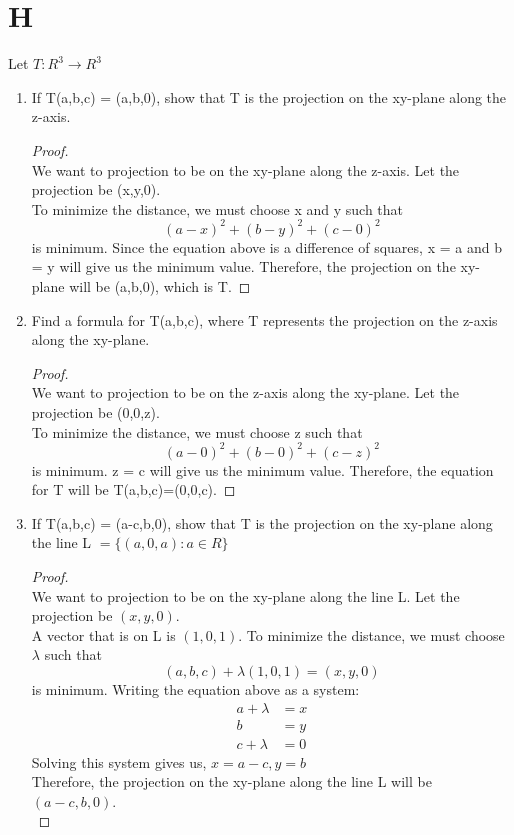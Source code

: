 \documentclass[11pt]{scrartcl}
\begin{document}
\section{H} 
Let $T: R^3 \rightarrow R^3$
\begin{enumerate}[label=\alph*.]
	\item{
	If T(a,b,c) = (a,b,0), show that T is the projection on the xy-plane along the z-axis.	
	\begin{proof}
	\-\\
	We want to projection to be on the xy-plane along the z-axis. Let the projection be (x,y,0).\\
	To minimize the distance, we must choose x and y such that
	$$(a - x)^2 + (b - y)^2 + (c - 0)^2$$
	is minimum.
	Since the equation above is a difference of squares, x = a and b = y will give us the minimum value.
	Therefore, the projection on the xy-plane will be (a,b,0), which is T.
	\end{proof}
	}
	
	\item{
	Find a formula for T(a,b,c), where T represents the projection on the z-axis along the xy-plane.
	\begin{proof}
	\-\\
	We want to projection to be on the z-axis along the xy-plane. Let the projection be (0,0,z).\\
	To minimize the distance, we must choose z such that
	$$(a - 0)^2 + (b - 0)^2 + (c - z)^2$$
	is minimum.
	z = c will give us the minimum value.
	Therefore, the equation for T will be T(a,b,c)=(0,0,c).
	\end{proof}
	}

	\item{
	If T(a,b,c) = (a-c,b,0), show that T is the projection on the xy-plane along the line L $= \{(a,0,a):a \in R\}$
	\begin{proof}
	\-\\
	We want to projection to be on the xy-plane along the line L. Let the projection be $(x,y,0)$.\\
	A vector that is on L is $(1,0,1)$.
	To minimize the distance, we must choose $\lambda$ such that
	$$(a,b,c) + \lambda (1,0,1) = (x,y,0)$$
	is minimum. Writing the equation above as a system:
	\[
	\begin{align*}
		a + \lambda &= x\\
		b &= y\\
		c + \lambda &= 0
	\end{align*}
	\]
	Solving this system gives us, $x = a - c, y = b$\\ 
	Therefore, the projection on the xy-plane along the line L will be $(a-c,b,0)$.\\
	\end{proof}
	}

\end{enumerate}
\end{document}
